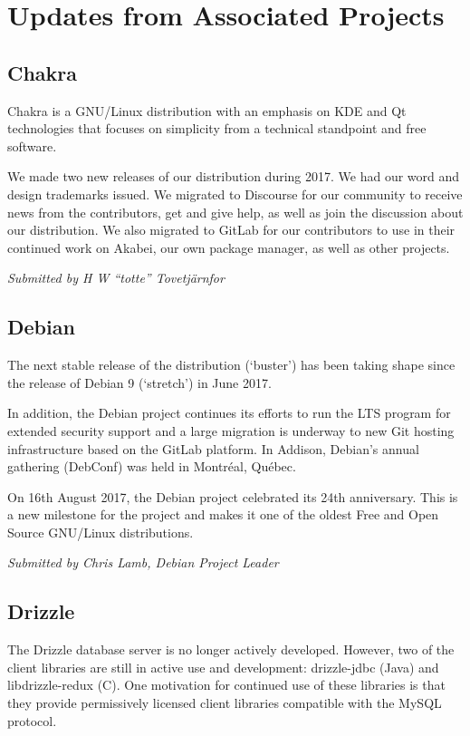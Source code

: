 \documentclass[a4paper]{report}
\begin{document}
\section{Updates from Associated Projects}

\subsection{Chakra}

Chakra is a GNU/Linux distribution with an emphasis on KDE and Qt
technologies that focuses on simplicity from a technical standpoint and
free software.

We made two new releases of our distribution during 2017. We had our
word and design trademarks issued. We migrated to Discourse for our
community to receive news from the contributors, get and give help, as
well as join the discussion about our distribution. We also migrated to
GitLab for our contributors to use in their continued work on Akabei,
our own package manager, as well as other projects.

{\em Submitted by H W ``totte'' Tovetjärnfor}

\subsection{Debian}

The next stable release of the distribution (`buster') has been taking
shape since the release of Debian 9 (`stretch') in June 2017.

In addition, the Debian project continues its efforts to run the LTS
program for extended security support and a large migration is underway
to new Git hosting infrastructure based on the GitLab platform. In
Addison, Debian's annual gathering (DebConf) was held in Montréal,
Québec.

On 16th August 2017, the Debian project celebrated its 24th anniversary.
This is a new milestone for the project and makes it one of the oldest
Free and Open Source GNU/Linux distributions.

{\em Submitted by Chris Lamb, Debian Project Leader}

\subsection{Drizzle}

The Drizzle database server is no longer actively developed. However,
two of the client libraries are still in active use and development:
drizzle-jdbc (Java) and libdrizzle-redux (C). One motivation for
continued use of these libraries is that they provide permissively
licensed client libraries compatible with the MySQL protocol.
\end{document}
